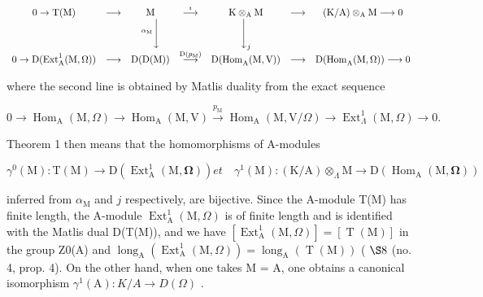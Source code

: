 \[
\begin{array}{c c c c c c c} 0 \to \mathrm{T(M)} & \longrightarrow & \mathrm{M} & \stackrel {{\imath}} {{\longrightarrow}} & \mathrm {K\otimes_ {A} M} & \longrightarrow & (\mathrm{K/A}) \otimes_ {\mathrm{A}} \mathrm{M} \longrightarrow 0 \\ & & ^ {\alpha_ {\mathrm{M}}} \Bigg \downarrow & & \Bigg \downarrow_ {j} \\ 0 \to \mathrm{D(Ext} _ {\mathrm{A}} ^ {1} (\mathrm{M}, \Omega)) & \longrightarrow & \mathrm{D(D(M))} & \stackrel {{\mathrm{D} (p _ {\mathrm{M}})}} {{\longrightarrow}} & \mathrm{D(Hom} _ {\mathrm{A}} (\mathrm{M}, \mathrm{V})) & \longrightarrow & \mathrm{D(Hom} _ {\mathrm{A}} (\mathrm{M}, \Omega)) \longrightarrow 0 \end{array}
\]

where the second line is obtained by Matlis duality from the exact sequence

\[
0 \rightarrow \operatorname{Hom} _ {\mathrm{A}} (\mathrm{M}, \Omega) \longrightarrow \operatorname{Hom} _ {\mathrm{A}} (\mathrm{M}, \mathrm{V}) \xrightarrow {p _ {\mathrm{M}}} \operatorname{Hom} _ {\mathrm{A}} (\mathrm{M}, \mathrm{V} / \Omega) \longrightarrow \operatorname{Ext} _ {\Lambda} ^ {1} (\mathrm{M}, \Omega) \rightarrow 0.
\]

Theorem 1 then means that the homomorphisms of A-modules

\[
\gamma^ {0} (\mathrm{M}): \mathrm{T} (\mathrm{M}) \longrightarrow \mathrm{D} \left(\operatorname{Ext} _ {\mathrm{A}} ^ {1} (\mathrm{M}, \boldsymbol {\Omega})\right) e t \quad \gamma^ {1} (\mathrm{M}): (\mathrm{K} / \mathrm{A}) \otimes_ {\Lambda} \mathrm{M} \longrightarrow \mathrm{D} \left(\operatorname{Hom} _ {\mathrm{A}} (\mathrm{M}, \boldsymbol {\Omega})\right)
\]

inferred from \(\alpha_{\mathrm{M}}\) and \(j\) respectively, are bijective. Since the A-module T(M) has finite length, the A-module \(\operatorname{Ext}_{\mathrm{A}}^{1}(\mathrm{M},\Omega)\) is of finite length and is identified with the Matlis dual D(T(M)), and we have \([\operatorname{Ext}_{\mathrm{A}}^{1}(\mathrm{M},\Omega)] = [\operatorname{T}(\mathrm{M})]\) in the group Z0(A) and \(\operatorname{long}_{\mathrm{A}}(\operatorname{Ext}_{\mathrm{A}}^{1}(\mathrm{M},\Omega)) = \operatorname{long}_{\mathrm{A}}(\operatorname{T}(\mathrm{M}))\) ( \(\S 8\) (no. 4, prop. 4). On the other hand, when one takes M = A, one obtains a canonical isomorphism \(\gamma^{1}(\mathrm{A}):K / A\to D(\Omega)\) .

